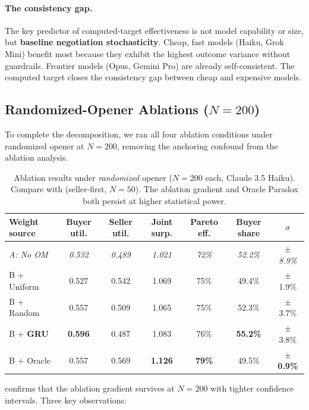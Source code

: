 \documentclass[11pt,a4paper]{article}
\begin{document}
\paragraph{The consistency gap.} The key predictor of computed-target effectiveness is not model capability or size, but \textbf{baseline negotiation stochasticity}. Cheap, fast models (Haiku, Grok Mini) benefit most because they exhibit the highest outcome variance without guardrails. Frontier models (Opus, Gemini Pro) are already self-consistent. The computed target closes the consistency gap between cheap and expensive models.

\subsection{\texorpdfstring{Randomized-Opener Ablations ($N = 200$)}{Randomized-Opener Ablations (N = 200)}}
\label{sec:ablation_opener}

To complete the decomposition, we ran all four ablation conditions under randomized opener at $N = 200$, removing the anchoring confound from the ablation analysis.

\begin{table}[t]
\centering
\caption{Ablation results under \emph{randomized} opener ($N = 200$ each, Claude 3.5 Haiku). Compare with  (seller-first, $N = 50$). The ablation gradient and Oracle Paradox both persist at higher statistical power.}
\label{tab:ablation_opener}
\small
\begin{tabular}{lcccccc}
\toprule
Weight source & Buyer util. & Seller util. & Joint surp. & Pareto eff. & Buyer share & $\sigma$ \\
\midrule
\emph{A: No OM} & \emph{0.532} & \emph{0.489} & \emph{1.021} & \emph{72\%} & \emph{52.2\%} & \emph{$\pm$ 8.9\%} \\
\midrule
B + Uniform & 0.527 & 0.542 & 1.069 & 75\% & 49.4\% & $\pm$ 1.9\% \\
B + Random & 0.557 & 0.509 & 1.065 & 75\% & 52.3\% & $\pm$ 3.7\% \\
B + \textbf{GRU} & \textbf{0.596} & 0.487 & 1.083 & 76\% & \textbf{55.2\%} & $\pm$ 3.8\% \\
B + Oracle & 0.557 & 0.569 & \textbf{1.126} & \textbf{79\%} & 49.5\% & $\pm$ \textbf{0.9\%} \\
\bottomrule
\end{tabular}
\end{table}

 confirms that the ablation gradient survives at $N = 200$ with tighter confidence intervals. Three key observations:
\end{document}
